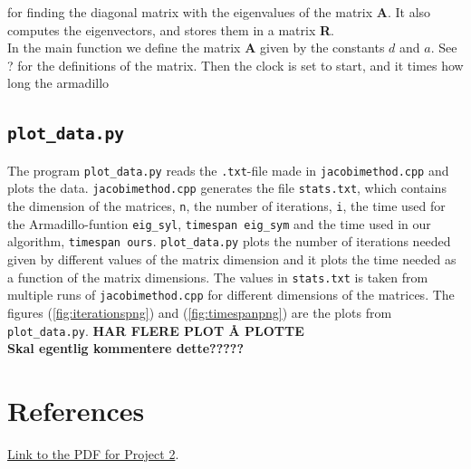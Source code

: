 \documentclass{article}
\begin{document}
for finding the diagonal matrix with the eigenvalues of the matrix \textbf{A}. It also computes the eigenvectors, and stores them in a matrix \textbf{R}. \\

In the main function we define the matrix \textbf{A} given by the constants $d$ and $a$. See ? for the definitions of the matrix. Then the clock is set to start, and it times how long the armadillo \\



\subsection{\texttt{plot\_data.py}}

The program \texttt{plot\_data.py} reads the \texttt{.txt}-file made in \texttt{jacobimethod.cpp} and plots the data. \texttt{jacobimethod.cpp} generates the file \texttt{stats.txt}, which contains the dimension of the matrices, \texttt{n}, the number of iterations, \texttt{i}, the time used for the Armadillo-funtion \texttt{eig\_syl}, \texttt{timespan eig\_sym} and the time used in our algorithm, \texttt{timespan ours}.
\texttt{plot\_data.py} plots the number of iterations needed given by different values of the matrix dimension and it plots the time needed as a function of the matrix dimensions. The values in \texttt{stats.txt} is taken from multiple runs of \texttt{jacobimethod.cpp} for different dimensions of the matrices. The figures (\ref{fig:iterationspng}) and (\ref{fig:timespanpng}) are the plots from \texttt{plot\_data.py}. \textbf{HAR FLERE PLOT Å PLOTTE} \\

\textbf{Skal egentlig kommentere dette?????} \\






\vspace{1cm}

\section{References} \label{sec:References}

\href{https://github.com/CompPhysics/ComputationalPhysics/blob/master/doc/Projects/2019/Project2/pdf/Project2.pdf}{Link to the PDF for Project 2}. \\
\end{document}
